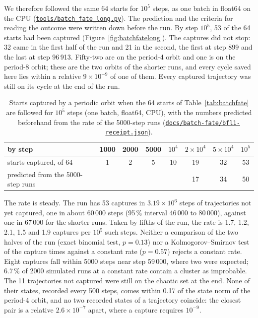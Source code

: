 \documentclass[11pt,letterpaper]{article}
\newcommand{\repourl}{https://github.com/tdj28/neural-shrimp}
\newcommand{\censusrepo}[1]{\href{\repourl/blob/bad2d5c576e913ab9472cd3b2faefa6d769f60ad/#1}{\nolinkurl{#1}}}
\begin{document}
We therefore followed the same 64 starts for $10^5$ steps, as one batch in float64 on the CPU
(\censusrepo{tools/batch_fate_long.py}). The prediction and the criteria for reading the outcome were written down
before the run. By step $10^5$, 53 of the 64 starts had been captured (Figure~\ref{fig:batchfatelong}). The captures
did not stop: 32 came in the first half of the run and 21 in the second, the first at step 899 and the last at step
96\,913. Fifty-two are on the period-4 orbit and one is on the period-8 orbit; these are the two orbits of the
shorter runs, and every cycle saved here lies within a relative $9\times10^{-9}$ of one of them. Every captured
trajectory was still on its cycle at the end of the run.

\begin{table}[H]
\centering\small
\begin{tabular}{lccccccc}
\toprule
by step & 1000 & 2000 & 5000 & $10^4$ & $2\times10^4$ & $5\times10^4$ & $10^5$ \\
\midrule
starts captured, of 64 & 1 & 2 & 5 & 10 & 19 & 32 & 53 \\
predicted from the 5000-step runs & & & & & 17 & 34 & 50 \\
\bottomrule
\end{tabular}
\caption{Starts captured by a periodic orbit when the 64 starts of Table~\ref{tab:batchfate} are followed for $10^5$
steps (one batch, float64, CPU), with the numbers predicted beforehand from the rate of the 5000-step runs
(\censusrepo{docs/batch-fate/bfl1-receipt.json}).}
\label{tab:batchfatelong}
\end{table}

The rate is steady. The run has 53 captures in $3.19\times10^{6}$ steps of trajectories not yet captured, one in
about 60\,000 steps (95\,\% interval 46\,000 to 80\,000), against one in 67\,000 for the shorter runs. Taken by
fifths of the run, the rate is 1.7, 1.2, 2.1, 1.5 and 1.9 captures per $10^5$ such steps. Neither a comparison of the
two halves of the run (exact binomial test, $p=0.13$) nor a Kolmogorov--Smirnov test of the capture times against a
constant rate ($p=0.57$) rejects a constant rate. Eight captures fall within 5000 steps near step 59\,000, where two
were expected; 6.7\,\% of 2000 simulated runs at a constant rate contain a cluster as improbable. The 11 trajectories
not captured were still on the chaotic set at the end. None of their states, recorded every 500 steps, comes within
0.17 of the state norm of the period-4 orbit, and no two recorded states of a trajectory coincide: the closest pair
is a relative $2.6\times10^{-7}$ apart, where a capture requires $10^{-9}$.
\end{document}

